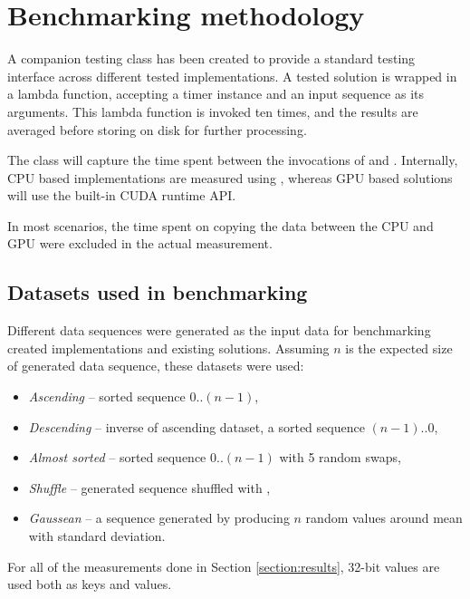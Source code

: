 \section{Benchmarking methodology}\label{section:benchmarking}

A companion testing class  has been created to provide a standard testing interface across different tested implementations. A tested solution is wrapped in a lambda function, accepting a timer instance and an input sequence as its arguments. This lambda function is invoked ten times, and the results are averaged before storing on disk for further processing.

The  class will capture the time spent between the invocations of  and . Internally, CPU based implementations are  measured using , whereas GPU based solutions will use the built-in CUDA runtime API.

In most scenarios, the time spent on copying the data between the CPU and GPU were excluded in the actual measurement.

\subsection{Datasets used in benchmarking}\label{subsection:benchmark:datasets}

Different data sequences were generated as the input data for benchmarking created implementations and existing solutions. Assuming $n$ is the expected size of generated data sequence, these datasets were used:

\begin{itemize}
  \item \textit{Ascending} -- sorted sequence $0..(n-1)$,
  \item \textit{Descending} -- inverse of ascending dataset, a sorted sequence $(n-1)..0$,
  \item \textit{Almost sorted} -- sorted sequence $0..(n-1)$ with 5 random swaps,
  \item \textit{Shuffle} -- generated sequence shuffled with ,
  \item \textit{Gaussean} -- a sequence generated by producing $n$ random values around mean with standard deviation.
\end{itemize}

For all of the measurements done in Section \ref{section:results}, 32-bit values are used both as keys and values.

